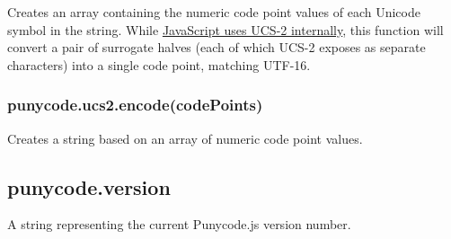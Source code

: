 Creates an array containing the numeric code point values of each
Unicode symbol in the string. While
\href{http://mathiasbynens.be/notes/javascript-encoding}{JavaScript uses
UCS-2 internally}, this function will convert a pair of surrogate halves
(each of which UCS-2 exposes as separate characters) into a single code
point, matching UTF-16.

\begin{Shaded}
\begin{Highlighting}[]
\NormalTok{(}\NormalTok{); }\CommentTok{// [0x61, 0x62, 0x63]}
\NormalTok{(}\NormalTok{); }\CommentTok{// [0x1D306]}
\end{Highlighting}
\end{Shaded}

\subsubsection{punycode.ucs2.encode(codePoints)}

Creates a string based on an array of numeric code point values.

\begin{Shaded}
\begin{Highlighting}[]
\NormalTok{([}\NormalTok{, }\NormalTok{, }\NormalTok{]); }
\NormalTok{([}\NormalTok{]); }
\end{Highlighting}
\end{Shaded}

\subsection{punycode.version}

A string representing the current Punycode.js version number.
